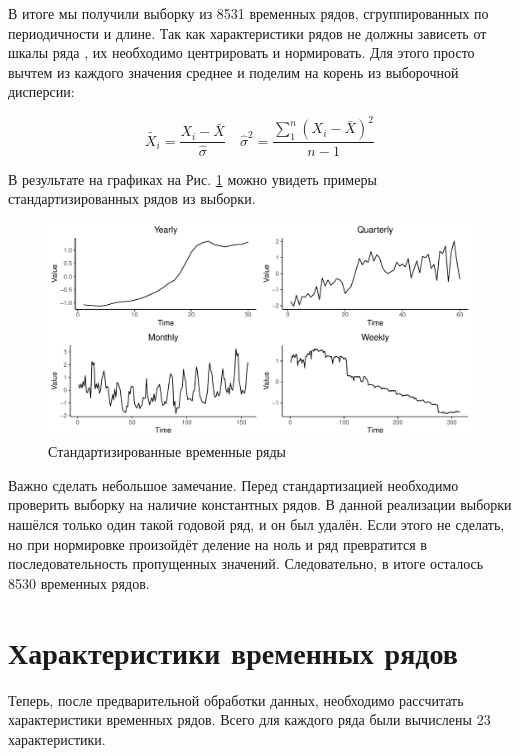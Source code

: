 \documentclass[a4paper,12pt]{article}
\begin{document}
В итоге мы получили выборку из 8531 временных рядов, сгруппированных по периодичности и длине. Так как характеристики рядов не должны зависеть от шкалы ряда \cite[cтр.~4]{start}, их необходимо центрировать и нормировать. Для этого просто вычтем из каждого значения среднее и поделим на корень из выборочной дисперсии:

\[ \tilde{X_i} = \frac{X_i - \bar{X}}{\hat{\sigma}} \quad \hat{\sigma}^2 =  \frac{\sum_{1}^{n} (X_i - \bar{X})^2}{n - 1}  \]

В результате на графиках на Рис. \ref{examples} можно увидеть примеры стандартизированных рядов из выборки.
\begin{figure}[h]
	
	\centering
	\includegraphics[width=1\linewidth]{time_series}
	
	
	\caption{Стандартизированные временные ряды}
	\label{examples}
\end{figure}
	
Важно сделать небольшое замечание. Перед стандартизацией необходимо проверить выборку на наличие константных рядов. В данной реализации выборки нашёлся только один такой годовой ряд, и он был удалён. Если этого не сделать, но при нормировке произойдёт деление на ноль и ряд превратится в последовательность пропущенных значений. Следовательно, в итоге осталось 8530 временных рядов.
	

\newpage
\section{Характеристики временных рядов}

Теперь, после предварительной обработки данных, необходимо рассчитать характеристики временных рядов. Всего для каждого ряда были вычислены 23 характеристики. \cite{start}
\end{document}
